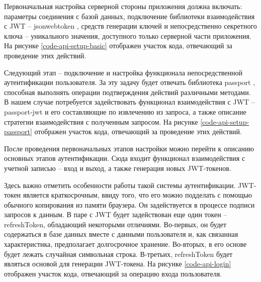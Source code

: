 Первоначальная настройка серверной стороны приложения должна включать: параметры соединения с базой данных, подключение библиотеки взаимодействия с JWT -- jsonwebtoken  \cite{npm-jsonwebtoken}, средств генерации ключей и непосредственно секретного ключа -- уникального значения, доступного только серверной части приложения.
На рисунке \ref{code-api-setup-basic} отображен участок кода, отвечающий за проведение этих действий.


Следующий этап -- подключение и настройка функционала непосредственной аутентификации пользователя.
За эту задачу будет отвечать библиотека passport \cite{npm-passport}, способная выполнять операции подтверждения действий различными методами.
В нашем случае потребуется задействовать функционал взаимодействия с JWT -- passport-jwt и его составляющие по извлечению из запроса, а также описание стратегии взаимодействия с полученным запросом.
На рисунке \ref{code-api-setup-passport} отображен участок кода, отвечающий за проведение этих действий.


После проведения первоначальных этапов настройки можно перейти к описанию основных этапов аутентификации.
Сюда входит функционал взаимодействия с учетной записью -- вход и выход, а также генерация новых JWT-токенов.

Здесь важно отметить особенности работы такой системы аутентификации.
JWT-токен является краткосрочным, ввиду того, что его можно подделать с помощью обычного копирования из памяти браузера.
Он задействуется в процессе подписи запросов к данным.
В паре с JWT будет задействован еще один токен -- refreshToken, обладающий некоторыми отличиями.
Во-первых, он будет содержаться в базе данных вместе с данными пользователя и, как связанная характеристика, предполагает долгосрочное хранение.
Во-вторых, в его основе будет лежать случайная символьная строка.
В-третьих, refreshToken будет являться основой для генерации JWT-токена.
На рисунке \ref{code-api-login} отображен участок кода, отвечающий за операцию входа пользователя.


